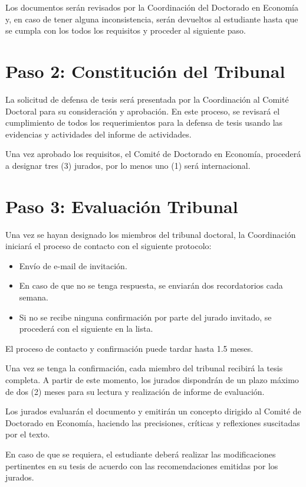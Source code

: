 Los documentos serán revisados por la Coordinación del Doctorado en Economía y, en caso de tener alguna inconsistencia, serán devueltos al estudiante hasta que se cumpla con los todos los requisitos y proceder al siguiente paso.

\section{Paso 2: Constitución del Tribunal}

La solicitud de defensa de tesis será presentada por la Coordinación al Comité Doctoral para su consideración y aprobación. En este proceso, se revisará el cumplimiento de todos los requerimientos para la defensa de tesis usando las evidencias y actividades del informe de actividades.

Una vez aprobado los requisitos, el Comité de Doctorado en Economía, procederá a designar tres (3) jurados, por lo menos uno (1) será internacional.

\section{Paso 3: Evaluación Tribunal}

Una vez se hayan designado los miembros del tribunal doctoral, la Coordinación iniciará el proceso de contacto con el siguiente protocolo:
\begin{itemize}
    \item Envío de e-mail de invitación.  
    \item En caso de que no se tenga respuesta, se enviarán dos recordatorios cada semana.
    \item Si no se recibe ninguna confirmación por parte del jurado invitado, se procederá con el siguiente en la lista. 
\end{itemize}

El proceso de contacto y confirmación puede tardar hasta 1.5 meses.

Una vez se tenga la confirmación, cada miembro del tribunal recibirá la tesis completa. A partir de este momento, los jurados dispondrán de un plazo máximo de dos (2) meses para su lectura y realización de informe de evaluación.

Los jurados evaluarán el documento y emitirán un concepto dirigido al Comité de Doctorado en Economía, haciendo las precisiones, críticas y reflexiones suscitadas por el texto. 

En caso de que se requiera, el estudiante deberá realizar las modificaciones pertinentes en su tesis de acuerdo con las recomendaciones emitidas por los jurados.

